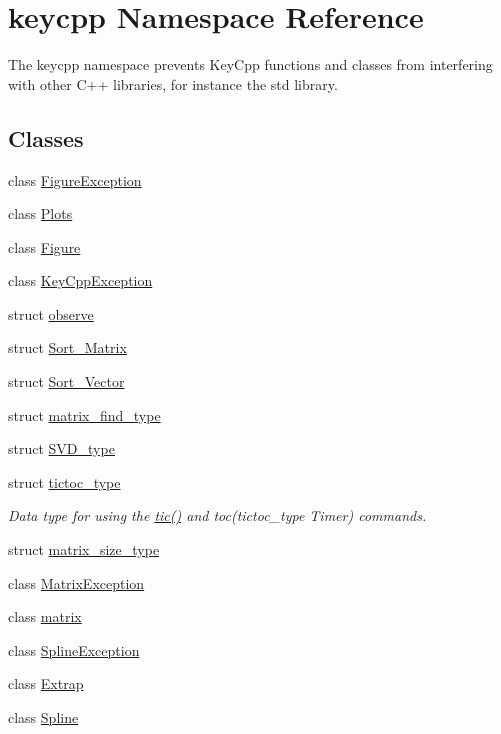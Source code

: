 \hypertarget{namespacekeycpp}{\section{keycpp Namespace Reference}
\label{namespacekeycpp}
}


The keycpp namespace prevents Key\-Cpp functions and classes from interfering with other C++ libraries, for instance the std library.  


\subsection*{Classes}
\begin{DoxyCompactItemize}
\item 
class \hyperlink{classkeycpp_1_1_figure_exception}{Figure\-Exception}
\item 
class \hyperlink{classkeycpp_1_1_plots}{Plots}
\item 
class \hyperlink{classkeycpp_1_1_figure}{Figure}
\item 
class \hyperlink{classkeycpp_1_1_key_cpp_exception}{Key\-Cpp\-Exception}
\item 
struct \hyperlink{structkeycpp_1_1observe}{observe}
\item 
struct \hyperlink{structkeycpp_1_1_sort___matrix}{Sort\-\_\-\-Matrix}
\item 
struct \hyperlink{structkeycpp_1_1_sort___vector}{Sort\-\_\-\-Vector}
\item 
struct \hyperlink{structkeycpp_1_1matrix__find__type}{matrix\-\_\-find\-\_\-type}
\item 
struct \hyperlink{structkeycpp_1_1_s_v_d__type}{S\-V\-D\-\_\-type}
\item 
struct \hyperlink{structkeycpp_1_1tictoc__type}{tictoc\-\_\-type}
\begin{DoxyCompactList}\small\item\em Data type for using the \hyperlink{namespacekeycpp_a6069a9eec0edfa1d401230013d98765e}{tic()} and toc(tictoc\-\_\-type Timer) commands. \end{DoxyCompactList}\item 
struct \hyperlink{structkeycpp_1_1matrix__size__type}{matrix\-\_\-size\-\_\-type}
\item 
class \hyperlink{classkeycpp_1_1_matrix_exception}{Matrix\-Exception}
\item 
class \hyperlink{classkeycpp_1_1matrix}{matrix}
\item 
class \hyperlink{classkeycpp_1_1_spline_exception}{Spline\-Exception}
\item 
class \hyperlink{classkeycpp_1_1_extrap}{Extrap}
\item 
class \hyperlink{classkeycpp_1_1_spline}{Spline}
\end{DoxyCompactItemize}
